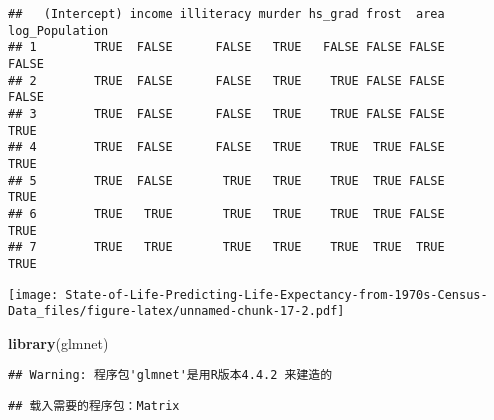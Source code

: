 \documentclass[
]{article}
\newenvironment{Shaded}{\begin{snugshade}}{\end{snugshade}}
\newcommand{\AttributeTok}[1]{\textcolor[rgb]{0.13,0.29,0.53}{#1}}
\newcommand{\DecValTok}[1]{\textcolor[rgb]{0.00,0.00,0.81}{#1}}
\newcommand{\FunctionTok}[1]{\textcolor[rgb]{0.13,0.29,0.53}{\textbf{#1}}}
\newcommand{\NormalTok}[1]{#1}
\newcommand{\OtherTok}[1]{\textcolor[rgb]{0.56,0.35,0.01}{#1}}
\newcommand{\SpecialCharTok}[1]{\textcolor[rgb]{0.81,0.36,0.00}{\textbf{#1}}}
\newcommand{\StringTok}[1]{\textcolor[rgb]{0.31,0.60,0.02}{#1}}
\begin{document}
\begin{verbatim}
##   (Intercept) income illiteracy murder hs_grad frost  area log_Population
## 1        TRUE  FALSE      FALSE   TRUE   FALSE FALSE FALSE          FALSE
## 2        TRUE  FALSE      FALSE   TRUE    TRUE FALSE FALSE          FALSE
## 3        TRUE  FALSE      FALSE   TRUE    TRUE FALSE FALSE           TRUE
## 4        TRUE  FALSE      FALSE   TRUE    TRUE  TRUE FALSE           TRUE
## 5        TRUE  FALSE       TRUE   TRUE    TRUE  TRUE FALSE           TRUE
## 6        TRUE   TRUE       TRUE   TRUE    TRUE  TRUE FALSE           TRUE
## 7        TRUE   TRUE       TRUE   TRUE    TRUE  TRUE  TRUE           TRUE
\end{verbatim}

\begin{Shaded}
\end{Shaded}

\texttt{[image: State-of-Life-Predicting-Life-Expectancy-from-1970s-Census-Data\_files/figure-latex/unnamed-chunk-17-2.pdf]}

\begin{Shaded}
\begin{Highlighting}[]
\FunctionTok{library}\NormalTok{(glmnet)}
\end{Highlighting}
\end{Shaded}

\begin{verbatim}
## Warning: 程序包'glmnet'是用R版本4.4.2 来建造的
\end{verbatim}

\begin{verbatim}
## 载入需要的程序包：Matrix
\end{verbatim}
\end{document}
